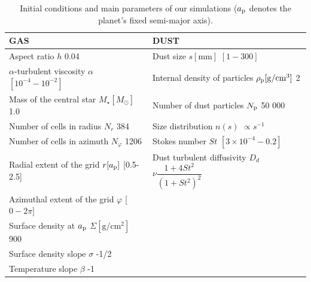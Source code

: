 \documentclass[fleqn,usenatbib]{mnras}
\begin{document}
\begin{table}
\caption{Initial conditions and main parameters of our simulations ($a_{\rm p}$ denotes the planet's fixed semi-major axis).}
    \label{tab:parameters}
\begin{tabular}{ p{8.5cm}||p{8.5cm}  }
 \hline
 GAS & DUST\\
 \hline
 Aspect ratio \hspace{2.9
 cm}        $h$  \hfill 0.04& Dust size \hspace{3.3cm} $s\mathrm{[mm]}$  \hfill  $[1-300]$\\
 $\alpha$-turbulent viscosity \hspace{1.85cm} $\alpha$  \hfill  $[10^{-4}-10^{-2}]$& Internal density of particles \hspace{1.25cm} $\mathit{\rho_{\rm p}\mathrm{[g/cm^3]}}$  \hfill  2 \\
 Mass of the central star \hspace{1.6cm} $M_{\star}[M_{\odot}]$  \hfill  1.0&  Number of dust particles \hspace{1.5cm} $N_{\rm p}$  \hfill  50 000  \\
Number of cells in radius \hspace{1.35cm}           $N_r$  \hfill    384& Size distribution \hspace{2.4cm} $n(s)$  \hfill  $\propto s^{-1}$ \\
Number of cells in azimuth \hspace{1.15cm}           $N_{\varphi}$  \hfill    1206& Stokes number \hspace{2.6cm} $St$  \hfill  $[3\times10^{-4}-0.2]$   \\
 Radial extent of the grid \hspace{1.5cm}           $r[a_{\rm p}]$  \hfill    [0.5-2.5]& Dust turbulent diffusivity  \hspace{1.45cm}           $D_d$  \hfill    $\nu\dfrac{1+4St^2}{(1+St^2)^2}$ \\
Azimuthal extent of the grid \hspace{1.05cm}           $\varphi$  \hfill    [$0-2\pi]$&  \\
 Surface density at $a_{\rm p}$ \hspace{1.9cm}           $\Sigma[\mathrm{g/cm^2}]$  \hfill    900&   \\
 Surface density slope \hspace{1.85cm}           $\sigma$  \hfill    -1/2&   \\
 Temperature slope \hspace{2.2cm}           $\beta$  \hfill    -1&   \\
 \hline
\end{tabular}
\end{table}
\end{document}
